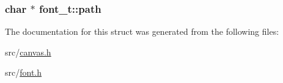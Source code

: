 \subsubsection[{path}]{\setlength{\rightskip}{0pt plus 5cm}char $\ast$ font\+\_\+t\+::path}\label{structfont__t_aa3c5e0635a023f249f7f46200e1a4267}


The documentation for this struct was generated from the following files\+:\begin{DoxyCompactItemize}
\item 
src/\hyperlink{canvas_8h}{canvas.\+h}\item 
src/\hyperlink{font_8h}{font.\+h}\end{DoxyCompactItemize}
